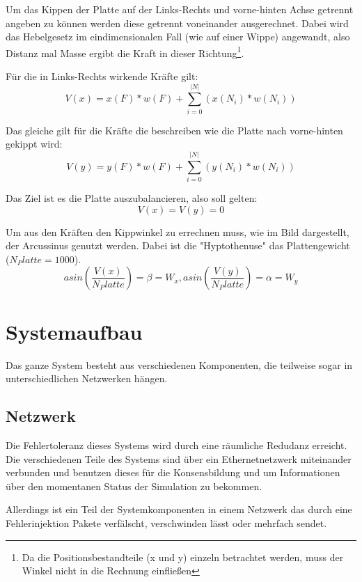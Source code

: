 \documentclass[
    12pt,
    bibliography=totoc,
    ngerman,
    enabledeprecatedfontcommands
]{scrartcl}
\begin{document}
Um das Kippen der Platte auf der Links-Rechts und vorne-hinten Achse getrennt angeben zu k{\"{o}}nnen werden diese getrennt voneinander ausgerechnet. Dabei wird das Hebelgesetz im eindimensionalen Fall (wie auf einer Wippe) angewandt, also Distanz mal Masse ergibt die Kraft in dieser Richtung\footnote{Da die Positionsbestandteile (x und y) einzeln betrachtet werden, muss der Winkel nicht in die Rechnung einflie{\ss}en}.

F{\"{u}}r die in Links-Rechts wirkende Kr{\"{a}}fte gilt:
$$ V(x) = x(F) * w(F) + \sum_{i=0}^{|N|} ( x(N_i) * w(N_i) ) $$

Das gleiche gilt f{\"{u}}r die Kr{\"{a}}fte die beschreiben wie die Platte nach vorne-hinten gekippt wird:
$$ V(y) = y(F) * w(F) + \sum_{i=0}^{|N|} ( y(N_i) * w(N_i) ) $$

Das Ziel ist es die Platte auszubalancieren, also soll gelten:
$$ V(x) = V(y) = 0 $$

Um aus den Kr{\"{a}}ften den Kippwinkel zu errechnen muss, wie im Bild dargestellt, der Arcussinus genutzt werden. Dabei ist die "Hyptothenuse" das Plattengewicht ($ N_Platte = 1000$). 
$$ asin(\frac{V(x)}{ N_Platte}) = \beta = W_{x}, asin(\frac{V(y)}{N_Platte}) = \alpha = W_{y} $$

\clearpage
\section{Systemaufbau}
Das ganze System besteht aus verschiedenen Komponenten, die teilweise sogar in unterschiedlichen Netzwerken h{\"{a}}ngen. 

\subsection{Netzwerk}\label{network}
Die Fehlertoleranz dieses Systems wird durch eine r{\"{a}}umliche Redudanz erreicht. Die verschiedenen Teile des Systems sind {\"{u}}ber ein Ethernetnetzwerk miteinander verbunden und benutzen dieses
f{\"{u}}r die Konsensbildung und um Informationen {\"{u}}ber den momentanen Status der Simulation zu bekommen.

Allerdings ist ein Teil der Systemkomponenten in einem Netzwerk das durch eine Fehlerinjektion Pakete verf{\"{a}}lscht, verschwinden l{\"{a}}sst oder mehrfach sendet. 
\end{document}
